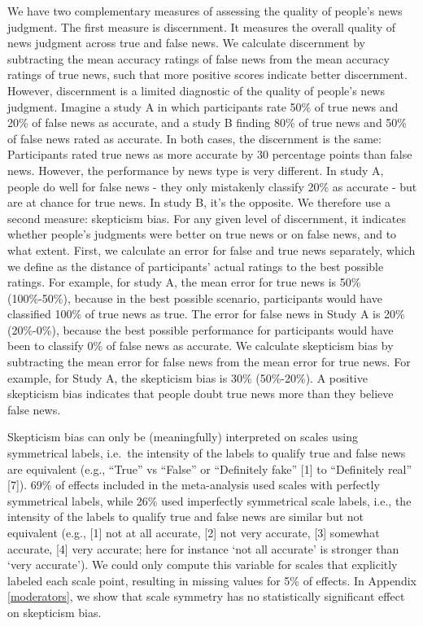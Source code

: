 \documentclass[
  man]{apa6}
\begin{document}
We have two complementary measures of assessing the quality of people's news judgment. The first measure is discernment. It measures the overall quality of news judgment across true and false news. We calculate discernment by subtracting the mean accuracy ratings of false news from the mean accuracy ratings of true news, such that more positive scores indicate better discernment. However, discernment is a limited diagnostic of the quality of people's news judgment. Imagine a study A in which participants rate 50\% of true news and 20\% of false news as accurate, and a study B finding 80\% of true news and 50\% of false news rated as accurate. In both cases, the discernment is the same: Participants rated true news as more accurate by 30 percentage points than false news. However, the performance by news type is very different. In study A, people do well for false news - they only mistakenly classify 20\% as accurate - but are at chance for true news. In study B, it's the opposite. We therefore use a second measure: skepticism bias. For any given level of discernment, it indicates whether people's judgments were better on true news or on false news, and to what extent. First, we calculate an error for false and true news separately, which we define as the distance of participants' actual ratings to the best possible ratings. For example, for study A, the mean error for true news is 50\% (100\%-50\%), because in the best possible scenario, participants would have classified 100\% of true news as true. The error for false news in Study A is 20\% (20\%-0\%), because the best possible performance for participants would have been to classify 0\% of false news as accurate. We calculate skepticism bias by subtracting the mean error for false news from the mean error for true news. For example, for Study A, the skepticism bias is 30\% (50\%-20\%). A positive skepticism bias indicates that people doubt true news more than they believe false news.

Skepticism bias can only be (meaningfully) interpreted on scales using symmetrical labels, i.e.~the intensity of the labels to qualify true and false news are equivalent (e.g., ``True'' vs ``False'' or ``Definitely fake'' {[}1{]} to ``Definitely real'' {[}7{]}). 69\% of effects included in the meta-analysis used scales with perfectly symmetrical labels, while 26\% used imperfectly symmetrical scale labels, i.e., the intensity of the labels to qualify true and false news are similar but not equivalent (e.g., {[}1{]} not at all accurate, {[}2{]} not very accurate, {[}3{]} somewhat accurate, {[}4{]} very accurate; here for instance `not all accurate' is stronger than `very accurate'). We could only compute this variable for scales that explicitly labeled each scale point, resulting in missing values for 5\% of effects. In Appendix \ref{moderators}, we show that scale symmetry has no statistically significant effect on skepticism bias.
\end{document}
